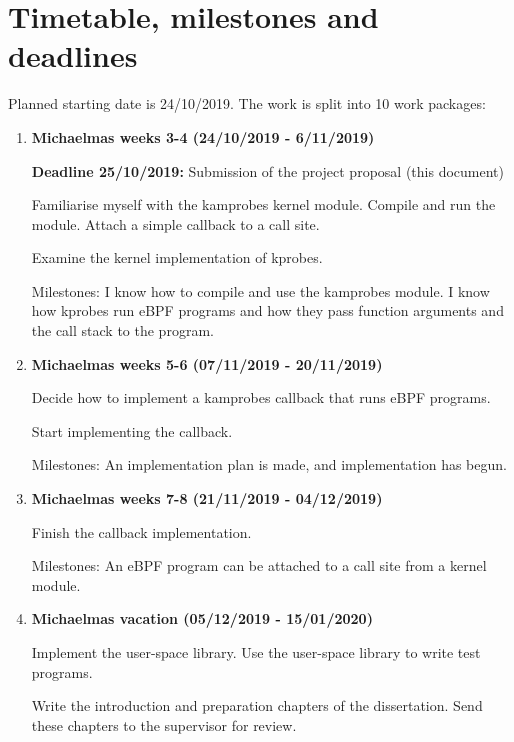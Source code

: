 \section*{Timetable, milestones and deadlines}

    Planned starting date is 24/10/2019. The work is split into 10 work packages:
    \begin{enumerate}

        \item {\bf Michaelmas weeks 3-4 (24/10/2019 - 6/11/2019)} 

            {\bf Deadline 25/10/2019:} Submission of the project proposal (this document) 

            Familiarise myself with the kamprobes kernel module. Compile and run the module.
            Attach a simple callback to a call site.

            Examine the kernel implementation of kprobes.

            Milestones: I know how to compile and use the kamprobes module.
            I know how kprobes run eBPF programs and how they pass function arguments and the call stack to the program.
        
        \item {\bf Michaelmas weeks 5-6 (07/11/2019 - 20/11/2019)} 

            Decide how to implement a kamprobes callback that runs eBPF programs.

            Start implementing the callback.

            Milestones: An implementation plan is made, and implementation has begun.

        \item {\bf Michaelmas weeks 7-8 (21/11/2019 - 04/12/2019)}

            Finish the callback implementation.

            Milestones: An eBPF program can be attached to a call site from a kernel module.

        \item {\bf Michaelmas vacation (05/12/2019 - 15/01/2020)}
        
            Implement the user-space library.
            Use the user-space library to write test programs.
            
            Write the introduction and preparation chapters of the dissertation.
            Send these chapters to the supervisor for review.


\end{enumerate}
